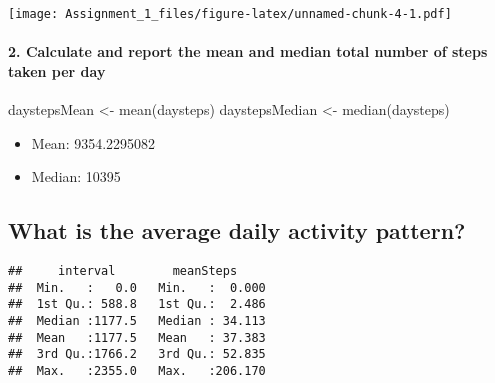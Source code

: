 \documentclass[
]{article}
\newenvironment{Shaded}{\begin{snugshade}}{\end{snugshade}}
\newcommand{\AttributeTok}[1]{\textcolor[rgb]{0.77,0.63,0.00}{#1}}
\newcommand{\ConstantTok}[1]{\textcolor[rgb]{0.00,0.00,0.00}{#1}}
\newcommand{\FunctionTok}[1]{\textcolor[rgb]{0.00,0.00,0.00}{#1}}
\newcommand{\NormalTok}[1]{#1}
\newcommand{\OtherTok}[1]{\textcolor[rgb]{0.56,0.35,0.01}{#1}}
\newcommand{\SpecialCharTok}[1]{\textcolor[rgb]{0.00,0.00,0.00}{#1}}
\providecommand{\tightlist}{%
  \setlength{\itemsep}{0pt}\setlength{\parskip}{0pt}}
\begin{document}
\texttt{[image: Assignment\_1\_files/figure-latex/unnamed-chunk-4-1.pdf]}

\hypertarget{calculate-and-report-the-mean-and-median-total-number-of-steps-taken-per-day}{%
\paragraph{2. Calculate and report the mean and median total number of
steps taken per
day}\label{calculate-and-report-the-mean-and-median-total-number-of-steps-taken-per-day}}

\begin{Shaded}
\begin{Highlighting}[]
\NormalTok{daystepsMean }\OtherTok{\textless{}{-}} \FunctionTok{mean}\NormalTok{(daysteps)}
\NormalTok{daystepsMedian }\OtherTok{\textless{}{-}} \FunctionTok{median}\NormalTok{(daysteps)}
\end{Highlighting}
\end{Shaded}

\begin{itemize}
\tightlist
\item
  Mean: 9354.2295082
\item
  Median: 10395
\end{itemize}

\hypertarget{what-is-the-average-daily-activity-pattern}{%
\subsection{What is the average daily activity
pattern?}\label{what-is-the-average-daily-activity-pattern}}

\begin{Shaded}
\end{Shaded}

\begin{verbatim}
##     interval        meanSteps      
##  Min.   :   0.0   Min.   :  0.000  
##  1st Qu.: 588.8   1st Qu.:  2.486  
##  Median :1177.5   Median : 34.113  
##  Mean   :1177.5   Mean   : 37.383  
##  3rd Qu.:1766.2   3rd Qu.: 52.835  
##  Max.   :2355.0   Max.   :206.170
\end{verbatim}
\end{document}
